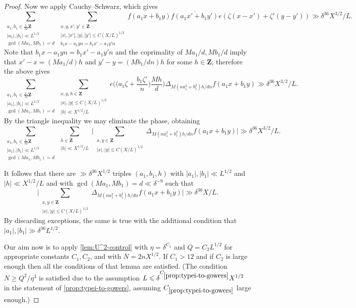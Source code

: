 \documentclass[11pt,reqno]{amsart}
\numberwithin{equation}{section}
\theoremstyle{definition}
\theoremstyle{remark}
\renewcommand{\le}{\leqslant}
\renewcommand{\ge}{\geqslant}
\newcommand\Z{\mathbf{Z}}
\begin{document}
\begin{proof}
Now we apply Cauchy--Schwarz, which gives
\[\sum_{\substack{a_1,b_1 \in \frac{1}{M}\Z \\ |a_1|, |b_1| \ll L^{1/2}\\\gcd(Ma_1,Mb_1) = d}}\sum_{\substack{x,y,x',y' \in \Z\\ |x|, |x'|, |y|, |y'| \le C(X/L)^{1/2}  \\ b_1x - a_1yn = b_1x' - a_1y' n}}f(a_1x + b_1y)\overline{f(a_1x' + b_1y')} e(\zeta (x - x') + \zeta'(y - y')) \gg \delta^{36} X^{3/2}/L.\]
Note that $b_1x - a_1yn = b_1x' - a_1y' n$ and the coprimality of $Ma_1/d,Mb_1/d$ imply that $x'-x = (Ma_1/d)h$ and $y'-y = (Mb_1 /dn) h$ for some $h \in \Z$; therefore the above gives
\[\sum_{\substack{a_1,b_1 \in \frac{1}{M}\Z \\ |a_1|, |b_1| \ll L^{1/2} \\ \gcd(Ma_1,Mb_1) = d}} \sum_{\substack{x,y,h \in \Z \\ |x|, |y| \le C(X/L)^{1/2} \\  |h| \ll X^{1/2}/L }} e\Big(\Big(a_1 \zeta + \frac{b_1 \zeta'}{n}\Big)\frac{M h}{d} \Big)\Delta_{M(na_1^2 + b_1^2)h/dn}f(a_1x + b_1y) \gg \delta^{36} X^{3/2}/L.\]
By the triangle inequality we may eliminate the phase, obtaining 
\[\sum_{\substack{a_1,b_1 \in \frac{1}{M}\Z \\ |a_1|, |b_1| \ll L^{1/2} \\ \gcd(Ma_1,Mb_1) = d}} \sum_{\substack{h \in \Z \\ |h| \ll X^{1/2}/L}} \Big| \sum_{\substack{x,y \in \Z \\ |x|, |y| \le C(X/L)^{1/2} }} \Delta_{M(na_1^2 + b_1^2)h/dn}f(a_1x + b_1y)\Big| \gg \delta^{36} X^{3/2}/L.\]

It follows that there are $\gg \delta^{36} X^{1/2}$ triples $(a_1,b_1, h)$ with $|a_1|, |b_1| \ll L^{1/2}$ and $|h| \ll X^{1/2}/L$ and with $\gcd(Ma_1, Mb_1) = d \ll \delta^{-9}$ such that 
\[ \Big|\sum_{\substack{x,y \in \Z \\ |x|, |y| \le C(X/L)^{1/2} }}\Delta_{M(na_1^2 + b_1^2)h/dn}f(a_1x + b_1y)\Big| \gg \delta^{36} X/L.\]
By discarding exceptions, the same is true with the additional condition that $|a_1|, |b_1| \gg \delta^{36} L^{1/2}$.

Our aim now is to apply \cref{lem:U^2-control} with $\eta = \delta^{C_1}$ and $Q = C_2L^{1/2}$ for appropriate constants $C_1, C_2$, and with $N = 2n X^{1/2}$. If $C_1 > 12$ and if $C_2$ is large enough then all the conditions of that lemma are satisfied. (The condition $N \ge Q^2/\eta^3$ is satisfied due to the assumption $L \le \delta^{C_{\ref{prop:typei-to-gowers}}} X^{1/2}$ in the statement of \cref{prop:typei-to-gowers}, assuming $C_{\ref{prop:typei-to-gowers}}$ large enough.)


\end{proof}
\end{document}

